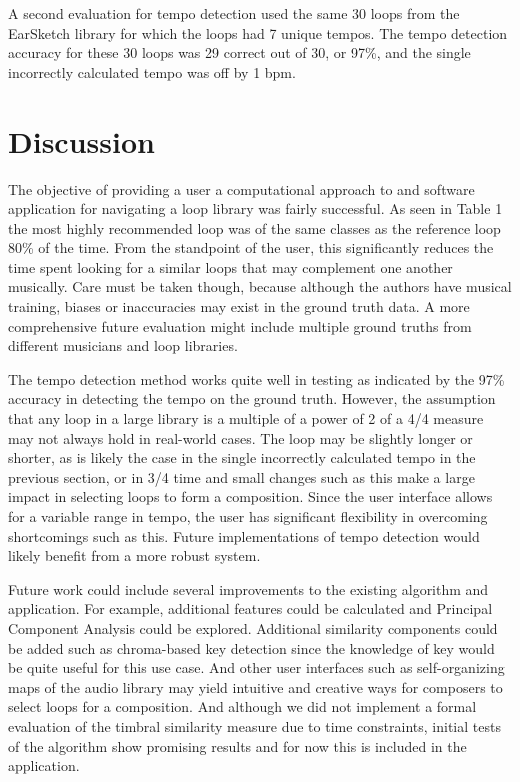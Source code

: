 \documentclass{article}
\begin{document}
A second evaluation for tempo detection used the same 30 loops from the EarSketch library for which the loops had 7 unique tempos. The tempo detection accuracy for these 30 loops was 29 correct out of 30, or 97\%, and the single incorrectly calculated tempo was off by 1 bpm.


\section{Discussion}

The objective of providing a user a computational approach to and software application for navigating a loop library was fairly successful. As seen in Table 1 the most highly recommended loop was of the same classes as the reference loop 80\% of the time. From the standpoint of the user, this significantly reduces the time spent looking for a similar loops that may complement one another musically. Care must be taken though, because although the authors have musical training, biases or inaccuracies may exist in the ground truth data. A more comprehensive future evaluation might include multiple ground truths from different musicians and loop libraries.

The tempo detection method works quite well in testing as indicated by the 97\% accuracy in detecting the tempo on the ground truth. However, the assumption that any loop in a large library is a multiple of a power of 2 of a 4/4 measure may not always hold in real-world cases. The loop may be slightly longer or shorter, as is likely the case in the single incorrectly calculated tempo in the previous section, or in 3/4 time and small changes such as this make a large impact in selecting loops to form a composition. Since the user interface allows for a variable range in tempo, the user has significant flexibility in overcoming shortcomings such as this. Future implementations of tempo detection would likely benefit from a more robust system.

Future work could include several improvements to the existing algorithm and application. For example, additional features could be calculated and Principal Component Analysis could be explored. Additional similarity components could be added such as chroma-based key detection since the knowledge of key would be quite useful for this use case. And other user interfaces such as self-organizing maps of the audio library may yield intuitive and creative ways for composers to select loops for a composition. And although we did not implement a formal evaluation of the timbral similarity measure due to time constraints, initial tests of the algorithm show promising results and for now this is included in the application.
\end{document}
